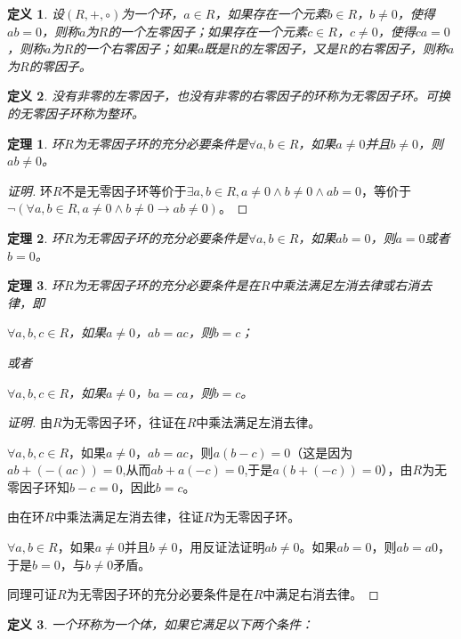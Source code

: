 \documentclass{article}
\newtheorem{Def}{定义}
\newtheorem{Thm}{定理}
\begin{document}
\begin{CJK*}{UTF8}{gbsn}
  \begin{Def}
    设$(R,+,\circ)$为一个环，$a\in R$，如果存在一个元素$b\in R$，$b\neq 0$，使得$ab=0$，则称$a$为$R$的一个左零因子；如果存在一个元素$c\in R$，$c\neq 0$，使得$ca=0$，则称$a$为$R$的一个右零因子；如果$a$既是$R$的左零因子，又是$R$的右零因子，则称$a$为$R$的零因子。
  \end{Def}
  
  \begin{Def}
    没有非零的左零因子，也没有非零的右零因子的环称为无零因子环。可换的无零因子环称为整环。
  \end{Def}
  
  \begin{Thm}
    环$R$为无零因子环的充分必要条件是$\forall a,b \in R$，如果$a\neq 0$并且$b\neq 0$，则$ab\neq 0$。
  \end{Thm}
  \begin{proof}[证明]
    环$R$不是无零因子环等价于$\exists a,b\in R, a\neq 0\land b\neq 0\land ab=0$，等价于$\lnot (\forall a,b\in R,a\neq 0\land b\neq 0 \to ab\neq 0)$。
  \end{proof}
  \begin{Thm}
    环$R$为无零因子环的充分必要条件是$\forall a,b\in R$，如果$ab=0$，则$a=0$或者$b=0$。
  \end{Thm}
  \begin{Thm}
    环$R$为无零因子环的充分必要条件是在$R$中乘法满足左消去律或右消去律，即
  
    $\forall a,b,c\in R$，如果$a\neq 0$，$ab=ac$，则$b=c$；
  
    或者
  
    $\forall a,b,c\in R$，如果$a\neq 0$，$ba=ca$，则$b=c$。
  
  \end{Thm}
  \begin{proof}[证明]
    由$R$为无零因子环，往证在$R$中乘法满足左消去律。
  
    $\forall a,b,c\in R$，如果$a\neq 0$，$ab=ac$，则$a(b-c)=0$（这是因为$ab+(-(ac))=0$,从而$ab+a(-c)=0$,于是$a(b+(-c))=0$），由$R$为无零因子环知$b-c=0$，因此$b=c$。
  
    由在环$R$中乘法满足左消去律，往证$R$为无零因子环。
  
  
    $\forall a,b\in R$，如果$a\neq 0$并且$b\neq 0$，用反证法证明$ab\neq 0$。如果$ab=0$，则$ab=a0$，于是$b=0$，与$b\neq 0$矛盾。
  
    同理可证$R$为无零因子环的充分必要条件是在$R$中满足右消去律。
  \end{proof}
  \begin{Def}
    一个环称为一个体，如果它满足以下两个条件：
  

\end{Def}
\end{CJK*}
\end{document}
